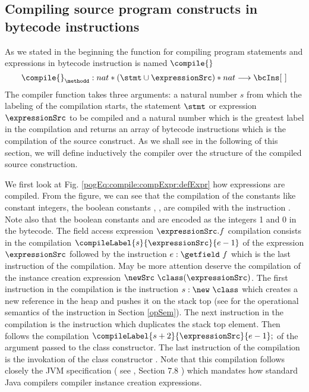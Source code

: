 

\subsection{Compiling source program  constructs in bytecode instructions} \label{pogEq:compile:compExpr} 

As we stated in the beginning the function for compiling program statements and expressions in bytecode instruction is named $\compile{}$
$$ \compile{ }_{\methodd} : nat * (\stmt \cup \expressionSrc )* nat \longrightarrow  \bcIns [ \ ]  $$
The compiler function takes three arguments: a natural number $s$ from which the labeling of the compilation starts,
 the statement $\stmt$ or expression $\expressionSrc$  to be compiled and a natural number which is
 the greatest label in the compilation 
and returns an array of bytecode instructions which is the compilation of the source construct.
As we shall see in the following of this section, we will define inductively the compiler over the structure
of the compiled source construction.

We first look at Fig. \ref{pogEq:compile:compExpr:defExpr} how expressions are compiled.
 From the figure, we can see that the compilation of
 the constants like constant integers, the boolean constants
\Mytrue, \Myfalse, \Mynull{}  are compiled with the instruction \push. Note also that the boolean constants  \Mytrue{} and \Myfalse{}
are encoded as the integers 1 and 0 in the bytecode.  The field access expression $ \expressionSrc.f$ compilation consists in the compilation
$\compileLabel{s}{\expressionSrc}{e - 1}$ of the expression   $ \expressionSrc $ followed by the instruction $ e: \getfield  \ f $ which is
 the last instruction of the compilation.  May be more attention deserve the compilation of the instance creation expression
$\newSrc \ \class  (\expressionSrc )$. The first instruction in the compilation is the instruction $s : \new \ \class$ which 
creates a new reference in the heap and pushes it on the stack top 
(see for the operational semantics of the instruction in Section \ref{opSem}). The next instruction in the compilation is the instruction 
\dup which duplicates the stack top element. Then follows the compilation 
$ \compileLabel{s+2}{\expressionSrc}{e - 1 }; $ of the argument passed to the class constructor. The last instruction of the compilation
is the invokation of the class constructor  \Constructor{\class}. Note that this compilation follows closely 
the JVM specification ( see \cite{VMSpec}, Section 7.8 ) which mandates 
how standard Java compilers compiler instance creation expressions.  
  
